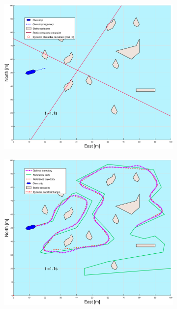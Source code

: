 \clearpage
\begin{figure}[!ht] %
    \begin{subfigure}[b]{0.49\textwidth}
        \centering
        \includegraphics[width=\textwidth]{Images/Figures/skjergard_u_trafikk/_Simple_1fig1_time=1}
    \end{subfigure}
    \hfill
    \begin{subfigure}[b]{0.499\textwidth}
        \centering
        \includegraphics[width=\textwidth]{Images/Figures/skjergard_u_trafikk/_Simple_1fig999_time=1}

\end{subfigure}
\end{figure}
